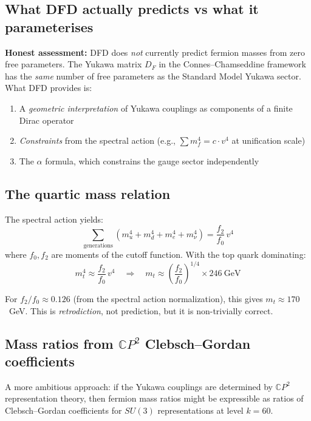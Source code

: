 \documentclass[11pt,a4paper]{article}
\newcommand{\CP}{\mathbb{C}P}
\begin{document}
\subsection{What DFD actually predicts vs what it parameterises}

\textbf{Honest assessment:} DFD does \emph{not} currently predict fermion masses from zero free parameters. The Yukawa matrix $D_F$ in the Connes--Chamseddine framework has the \emph{same} number of free parameters as the Standard Model Yukawa sector. What DFD provides is:

\begin{enumerate}
\item A \emph{geometric interpretation} of Yukawa couplings as components of a finite Dirac operator
\item \emph{Constraints} from the spectral action (e.g., $\sum m_f^4 = c \cdot v^4$ at unification scale)
\item The $\alpha$ formula, which constrains the gauge sector independently
\end{enumerate}

\subsection{The quartic mass relation}

The spectral action yields:
\begin{equation}
\boxed{\sum_{\text{generations}} \left(m_u^4 + m_d^4 + m_e^4 + m_\nu^4\right) = \frac{f_2}{f_0}\,v^4}
\end{equation}
where $f_0, f_2$ are moments of the cutoff function. With the top quark dominating:
\begin{equation}
m_t^4 \approx \frac{f_2}{f_0}\,v^4 \quad \Rightarrow \quad m_t \approx \left(\frac{f_2}{f_0}\right)^{1/4} \times 246~\text{GeV}
\end{equation}

For $f_2/f_0 \approx 0.126$ (from the spectral action normalization), this gives $m_t \approx 170$~GeV. This is \emph{retrodiction}, not prediction, but it is non-trivially correct.

\subsection{Mass ratios from $\CP^2$ Clebsch--Gordan coefficients}

A more ambitious approach: if the Yukawa couplings are determined by $\CP^2$ representation theory, then fermion mass ratios might be expressible as ratios of Clebsch--Gordan coefficients for $SU(3)$ representations at level $k = 60$.
\end{document}
